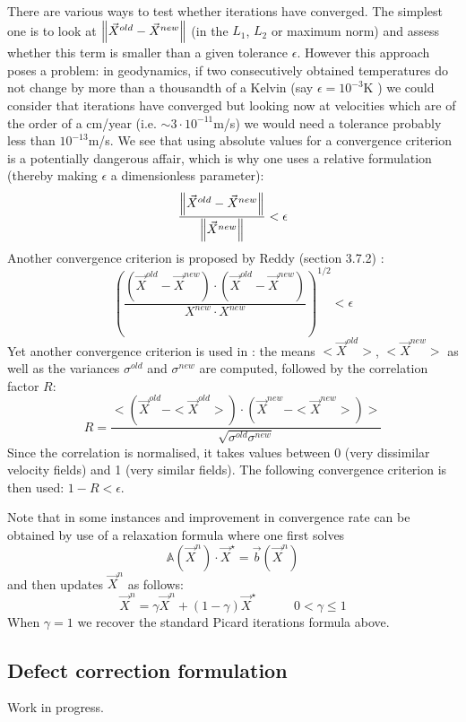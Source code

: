 There are various ways to test whether iterations have converged. The simplest
one is to look at $\left\lVert\vec X^{old}-\vec X^{new} \right\rVert$ (in the $L_1$, $L_2$ or maximum norm)
and assess whether this term is smaller than a given tolerance $\epsilon$. 
However this approach poses a problem: in geodynamics, if two consecutively obtained 
temperatures do not change by more than a thousandth of a Kelvin (say $\epsilon=10^{-3}$K )
we could consider that iterations have converged but looking now at velocities which 
are of the order of a cm/year (i.e. $\sim 3\cdot 10^{-11}$m/s) we would need a tolerance 
probably less than $10^{-13}$m/s. We see that using absolute values for a convergence 
criterion is a potentially dangerous affair, which is why one uses a relative 
formulation (thereby making $\epsilon$ a dimensionless parameter):
\[
\frac{\left\lVert\vec X^{old}-\vec X^{new}\right\rVert}{\left\lVert\vec X^{new}\right\rVert} < \epsilon
\]
Another convergence criterion is proposed by Reddy (section 3.7.2) \cite{reddybook2}:
\[
\left(
\frac{ (\vec X^{old}-\vec X^{new})\cdot(\vec X^{old}-\vec X^{new} ) }{ X^{new}\cdot X^{new}  } 
\right)^{1/2} < \epsilon
\]
Yet another convergence criterion is used in \cite{thie11}: the means $<\vec X^{old}>$, $<\vec X^{new}>$
as well as the variances $\sigma^{old}$ and $\sigma^{new}$ are computed, followed by the 
correlation factor $R$:
\[
R= \frac{ <  (\vec X^{old}-<\vec X^{old}>)\cdot( \vec X^{new}-<\vec X^{new}> )>  }{\sqrt{\sigma^{old}\sigma^{new}}}
\]
Since the correlation is normalised, it takes values between 0
(very dissimilar velocity fields) and 1 (very similar fields). The
following convergence criterion is then used: $1-R < \epsilon$.



Note that in some instances and improvement in convergence rate can be obtained by use of a 
relaxation formula where one first solves
\[
\mathbb{A}(\vec X^n) \cdot \vec X^{\star} = \vec b(\vec X^n)
\]
and then updates $\vec X^n$ as follows:
\[
\vec X^n = \gamma \vec X^n + (1-\gamma) \vec X^\star 
\quad\quad\quad
0 < \gamma \leq 1
\]
When $\gamma=1$ we recover the standard Picard iterations formula above.

\subsection{Defect correction formulation}

Work in progress. 

